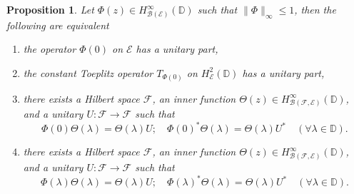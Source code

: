 \documentclass[12pt]{amsart}
\numberwithin{equation}{section}
\newtheorem{propn}{Proposition}[section]
\theoremstyle{definition}
\newcommand{\D}{\mathbb{D}}
\newcommand{\1}{{\mbox{\bf 1}}}
\newcommand{\clb}{\mathcal{B}}
\newcommand{\cle}{\mathcal{E}}
\newcommand{\clf}{\mathcal{F}}
\newcommand{\clk}{\mathcal{K}}
\newcommand{\clm}{\mathcal{M}}
\newcommand{\raro}{\rightarrow}
\begin{document}
\begin{propn}\label{analyticmainprop}
Let $\Phi(z) \in H_{\clb(\cle)}^{\infty}(\D)$ such that $\|\Phi\|_{\infty} \leq 1$, then the following are equivalent
\begin{enumerate}
\item[(i)] the operator $\Phi(0)$ on $\cle$ has a unitary part,
\item[(ii)] the constant Toeplitz operator $T_{\Phi(0)}$ on $H_{\cle}^2(\D)$ has a unitary part,
\item[(iii)] there exists a Hilbert space $\clf$, an inner function $\Theta(z) \in H_{\clb(\clf,\cle)}^{\infty}(\D)$, and a unitary $U: \clf \raro \clf$ such that
\begin{equation}\label{point1}
\Phi(0) \Theta(\lambda) = \Theta(\lambda) U; \quad \Phi(0)^* \Theta(\lambda) = \Theta(\lambda) U^* \quad (\forall \lambda \in \D).
\end{equation}
\item[(iv)] there exists a Hilbert space $\clf$, an inner function $\Theta(z) \in H_{\clb(\clf,\cle)}^{\infty}(\D)$, and a unitary $U: \clf \raro \clf$ such that
\begin{equation}\label{point2}
\Phi(\lambda) \Theta(\lambda) = \Theta(\lambda) U; \quad \Phi(\lambda)^* \Theta(\lambda) = \Theta(\lambda) U^* \quad (\forall \lambda \in \D).
\end{equation}
\end{enumerate}
\end{propn}
\end{document}
